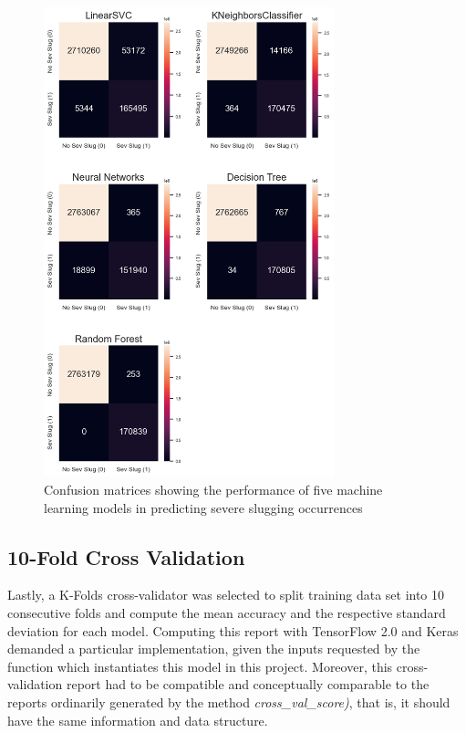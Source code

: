 \documentclass{article}
\begin{document}
\begin{figure}
\centering
\includegraphics[width=0.75\textwidth]{confusion_matrices.png}
\caption{\label{fig:confusion_matrices}Confusion matrices showing the performance of five machine learning models in predicting severe slugging occurrences}
\end{figure}

\subsection{10-Fold Cross Validation}
Lastly, a K-Folds cross-validator was selected to split training data set into 10 consecutive folds and compute the mean accuracy and the respective standard deviation for each model. Computing this report with TensorFlow 2.0 and Keras demanded a particular implementation, given the inputs requested by the function which instantiates this model in this project. Moreover, this cross-validation report had to be compatible and conceptually comparable to the reports ordinarily generated by the method \emph{cross\_val\_score)}, that is, it should have the same information and data structure. 
\end{document}
